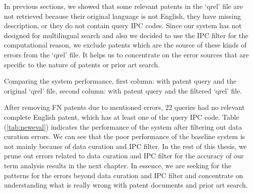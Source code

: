
In previous sections, we showed that some relevant patents in the `qrel' file are not retrieved because their original language is not English, they have missing description, or they do not contain query IPC codes. 
Since our system has not designed for multilingual search and also we decided to use the IPC filter for the computational reason, we exclude patents which are the source of these kinds of errors from the `qrel' file. It helps us to concentrate on the error sources that are specific to the nature of patents or prior art search.
\begin{table}[htpb]
  \begin{center}
   \caption{Comparing the system performance,
   first column: with patent query and the original `qrel' file, 
   second column: with patent query and the filtered `qrel' file.}
     
  \label{tab:neweval}
  \end{center}  
\end{table}
\FloatBarrier
After removing FN patents due to mentioned errors, 22 queries had no relevant complete English patent, which has at least one of the query IPC code. 
Table (\ref{tab:neweval}) indicates the performance of the system after filtering out data curation errors. We can see that the poor performance of the baseline system is not mainly because of data curation and IPC filter. In the rest of this thesis, we prune out errors related to data curation and IPC filter for the accuracy of our term analysis results in the next chapter. In essence, we are seeking for the patterns for the errors beyond data curation and IPC filter and concentrate on understanding what is really wrong with patent documents and prior art search. 

